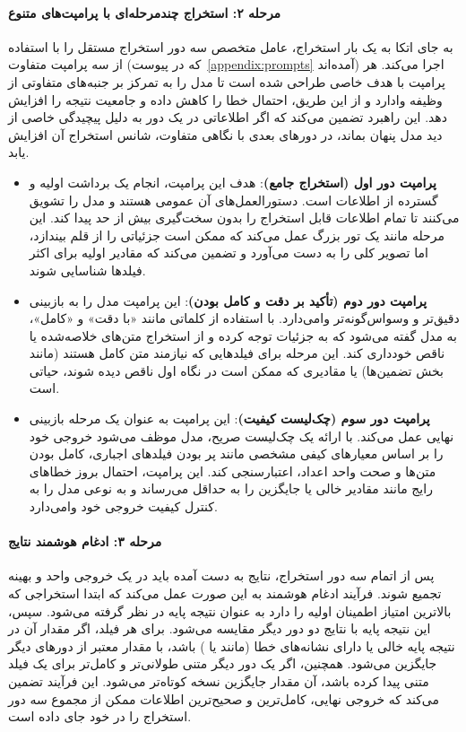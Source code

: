\paragraph{مرحله ۲: استخراج چندمرحله‌ای با پرامپت‌های متنوع}
به جای اتکا به یک بار استخراج، عامل متخصص سه دور استخراج مستقل را با استفاده از سه پرامپت متفاوت (که در پیوست~\ref{appendix:prompts} آمده‌اند) اجرا می‌کند. هر پرامپت با هدف خاصی طراحی شده است تا مدل را به تمرکز بر جنبه‌های متفاوتی از وظیفه وادارد و از این طریق، احتمال خطا را کاهش داده و جامعیت نتیجه را افزایش دهد. این راهبرد تضمین می‌کند که اگر اطلاعاتی در یک دور به دلیل پیچیدگی خاصی از دید مدل پنهان بماند، در دورهای بعدی با نگاهی متفاوت، شانس استخراج آن افزایش یابد.
\begin{itemize}
    \item \textbf{پرامپت دور اول (استخراج جامع)}: هدف این پرامپت، انجام یک برداشت اولیه و گسترده از اطلاعات است. دستورالعمل‌های آن عمومی هستند و مدل را تشویق می‌کنند تا تمام اطلاعات قابل استخراج را بدون سخت‌گیری بیش از حد پیدا کند. این مرحله مانند یک تور بزرگ عمل می‌کند که ممکن است جزئیاتی را از قلم بیندازد، اما تصویر کلی را به دست می‌آورد و تضمین می‌کند که مقادیر اولیه برای اکثر فیلدها شناسایی شوند.

    \item \textbf{پرامپت دور دوم (تأکید بر دقت و کامل بودن)}: این پرامپت مدل را به بازبینی دقیق‌تر و وسواس‌گونه‌تر وامی‌دارد. با استفاده از کلماتی مانند «با دقت» و «کامل»، به مدل گفته می‌شود که به جزئیات توجه کرده و از استخراج متن‌های خلاصه‌شده یا ناقص خودداری کند. این مرحله برای فیلدهایی که نیازمند متن کامل هستند (مانند بخش تضمین‌ها) یا مقادیری که ممکن است در نگاه اول ناقص دیده شوند، حیاتی است.

    \item \textbf{پرامپت دور سوم (چک‌لیست کیفیت)}: این پرامپت به عنوان یک مرحله بازبینی نهایی عمل می‌کند. با ارائه یک چک‌لیست صریح، مدل موظف می‌شود خروجی خود را بر اساس معیارهای کیفی مشخصی مانند پر بودن فیلدهای اجباری، کامل بودن متن‌ها و صحت واحد اعداد، اعتبارسنجی کند. این پرامپت، احتمال بروز خطاهای رایج مانند مقادیر خالی یا جایگزین را به حداقل می‌رساند و به نوعی مدل را به کنترل کیفیت خروجی خود وامی‌دارد.
\end{itemize}

\paragraph{مرحله ۳: ادغام هوشمند نتایج}
پس از اتمام سه دور استخراج، نتایج به دست آمده باید در یک خروجی واحد و بهینه تجمیع شوند. فرآیند ادغام هوشمند به این صورت عمل می‌کند که ابتدا استخراجی که بالاترین امتیاز اطمینان اولیه را دارد به عنوان نتیجه پایه در نظر گرفته می‌شود. سپس، این نتیجه پایه با نتایج دو دور دیگر مقایسه می‌شود. برای هر فیلد، اگر مقدار آن در نتیجه پایه خالی یا دارای نشانه‌های خطا (مانند  یا ) باشد، با مقدار معتبر از دورهای دیگر جایگزین می‌شود. همچنین، اگر یک دور دیگر متنی طولانی‌تر و کامل‌تر برای یک فیلد متنی پیدا کرده باشد، آن مقدار جایگزین نسخه کوتاه‌تر می‌شود. این فرآیند تضمین می‌کند که خروجی نهایی، کامل‌ترین و صحیح‌ترین اطلاعات ممکن از مجموع سه دور استخراج را در خود جای داده است.

